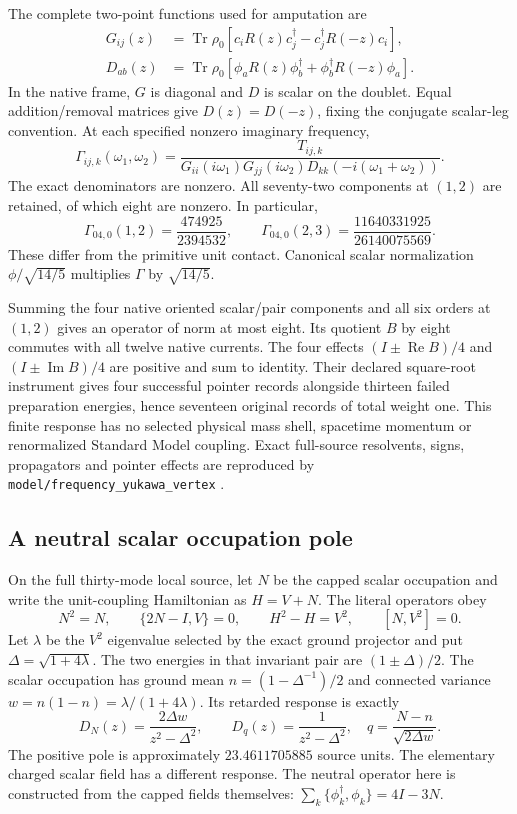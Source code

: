 The complete two-point functions used for amputation are
\[
 \begin{split}
 G_{ij}(z)&=\operatorname{Tr}\rho_0
  [c_iR(z)c_j^\dagger-c_j^\dagger R(-z)c_i],\\
 D_{ab}(z)&=\operatorname{Tr}\rho_0
  [\phi_aR(z)\phi_b^\dagger+\phi_b^\dagger R(-z)\phi_a].
 \end{split}
\]
In the native frame, $G$ is diagonal and $D$ is scalar on the doublet.
Equal addition/removal matrices give $D(z)=D(-z)$, fixing the conjugate
scalar-leg convention. At each specified nonzero imaginary frequency,
\[
 \Gamma_{ij,k}(\omega_1,\omega_2)=
 \frac{T_{ij,k}}{G_{ii}(i\omega_1)G_{jj}(i\omega_2)
                         D_{kk}(-i(\omega_1+\omega_2))}.
\]
The exact denominators are nonzero. All seventy-two components at
$(1,2)$ are retained, of which eight are nonzero. In particular,
\[
 \Gamma_{04,0}(1,2)=\frac{474925}{2394532},\qquad
 \Gamma_{04,0}(2,3)=\frac{11640331925}{26140075569}.
\]
These differ from the primitive unit contact. Canonical scalar
normalization $\phi/\sqrt{14/5}$ multiplies $\Gamma$ by $\sqrt{14/5}$.

Summing the four native oriented scalar/pair components and all six
orders at $(1,2)$ gives an operator of norm at most eight. Its quotient
$B$ by eight commutes with all twelve native currents. The four effects
$(I\pm\operatorname{Re}B)/4$ and
$(I\pm\operatorname{Im}B)/4$ are positive and sum to identity.
Their declared square-root instrument gives four successful pointer
records alongside thirteen failed preparation energies, hence seventeen
original records of total weight one. This finite response has no
selected physical mass shell, spacetime momentum or renormalized
Standard Model coupling. Exact full-source resolvents, signs,
propagators and pointer effects are reproduced by
\texttt{model/frequency\_yukawa\_vertex} \cite{ophrepo}.

\subsection{A neutral scalar occupation pole}

On the full thirty-mode local source, let $N$ be the capped scalar
occupation and write the unit-coupling Hamiltonian as $H=V+N$.
The literal operators obey
\[
 N^2=N,\qquad \{2N-I,V\}=0,\qquad H^2-H=V^2,\qquad [N,V^2]=0.
\]
Let $\lambda$ be the $V^2$ eigenvalue selected by the exact ground
projector and put $\Delta=\sqrt{1+4\lambda}$. The two energies in that
invariant pair are $(1\pm\Delta)/2$. The scalar occupation has ground
mean $n=(1-\Delta^{-1})/2$ and connected variance
$w=n(1-n)=\lambda/(1+4\lambda)$. Its retarded response is exactly
\[
 D_N(z)=\frac{2\Delta w}{z^2-\Delta^2},\qquad
 D_q(z)=\frac1{z^2-\Delta^2},\quad
 q=\frac{N-n}{\sqrt{2\Delta w}}.
\]
The positive pole is approximately $23.4611705885$ source units.
The elementary charged scalar field has a different response. The
neutral operator here is constructed from the capped fields themselves:
$\sum_k\{\phi_k^\dagger,\phi_k\}=4I-3N$.

